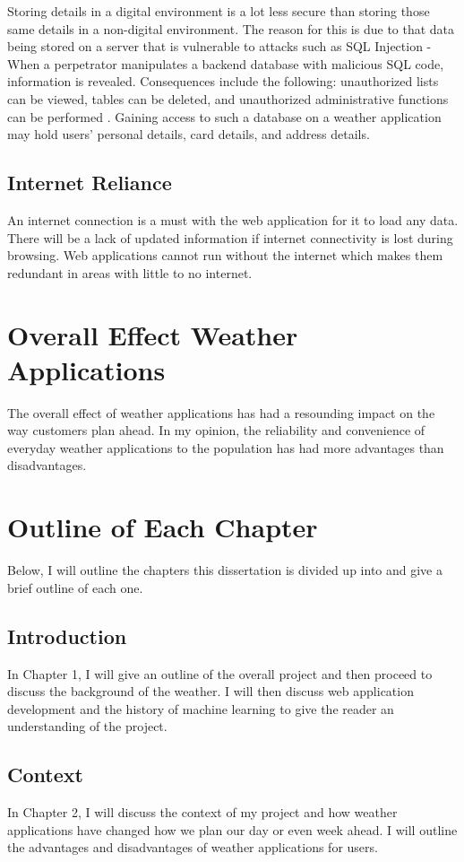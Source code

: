 Storing details in a digital environment is a lot less secure than storing those same details in a non-digital environment. The reason for this is due to that data being stored on a server that is vulnerable to attacks such as SQL Injection - When a perpetrator manipulates a backend database with malicious SQL code, information is revealed. Consequences include the following: unauthorized lists can be viewed, tables can be deleted, and unauthorized administrative functions can be performed \cite{sqlInjection}. Gaining access to such a database on a weather application may hold users' personal details, card details, and address details.

\subsection{Internet Reliance}

An internet connection is a must with the web application for it to load any data. There will be a lack of updated information if internet connectivity is lost during browsing. Web applications cannot run without the internet which makes them redundant in areas with little to no internet. 

\section{Overall Effect Weather Applications}

The overall effect of weather applications has had a resounding impact on the way customers plan ahead. In my opinion, the reliability and convenience of everyday weather applications to the population has had more advantages than disadvantages.
\newpage
\section{Outline of Each Chapter}
Below, I will outline the chapters this dissertation is divided up into and give a brief outline of each one.

\subsection{Introduction}
In Chapter 1, I will give an outline of the overall project and then proceed to discuss the background of the weather. I will then discuss web application development and the history of machine learning to give the reader an understanding of the project.

\subsection{Context}
In Chapter 2, I will discuss the context of my project and how weather applications have changed how we plan our day or even week ahead. I will outline the advantages and disadvantages of weather applications for users.

